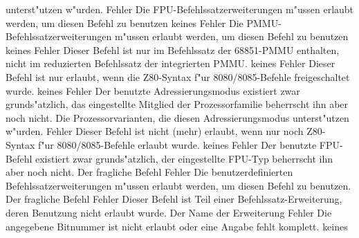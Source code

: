 \documentclass[12pt,a4paper,twoside]{report}
\begin{document}
\begin{description}
{                unterst"utzen w"urden.}
               {Fehler}
               {Die FPU-Befehlssatzerweiterungen m"ussen erlaubt
                werden, um diesen Befehl zu benutzen}
               {keines}
               {Fehler}
               {Die PMMU-Befehlssatzerweiterungen m"ussen erlaubt
                werden, um diesen Befehl zu benutzen}
               {keines}
               {Fehler}
               {Dieser Befehl ist nur im Befehlssatz der 
                68851-PMMU enthalten, nicht im reduzierten
                Befehlssatz der integrierten PMMU.}
               {keines}
               {Fehler}
               {Dieser Befehl ist nur erlaubt, wenn die
                Z80-Syntax f"ur 8080/8085-Befehle freigeschaltet
                wurde.}
               {keines}
               {Fehler}
               {Der benutzte Adressierungsmodus existiert
                zwar grunds"atzlich, das eingestellte Mitglied der
                Prozessorfamilie beherrscht ihn aber noch nicht.}
               {Die Prozessorvarianten, die diesen
                Adressierungsmodus unterst"utzen w"urden.}
               {Fehler}
               {Dieser Befehl ist nicht (mehr) erlaubt, wenn nur
                noch Z80-Syntax f"ur 8080/8085-Befehle erlaubt
                wurde.}
               {keines}
               {Fehler}
               {Der benutzte FPU-Befehl existiert zwar
                grunds"atzlich, der eingestellte FPU-Typ
                beherrscht ihn aber noch nicht.}
               {Der fragliche Befehl}
               {Fehler}
               {Die benutzerdefinierten Befehlssatzerweiterungen
                m"ussen erlaubt werden, um diesen Befehl zu benutzen.}
               {Der fragliche Befehl}
               {Fehler}
               {Dieser Befehl ist Teil einer Befehlssatz-Erweiterung,
                deren Benutzung nicht erlaubt wurde.}
               {Der Name der Erweiterung}
               {Fehler}
               {Die angegebene Bitnummer ist nicht erlaubt
	        oder eine Angabe fehlt komplett.}
               {keines}

\end{description}
\end{document}
